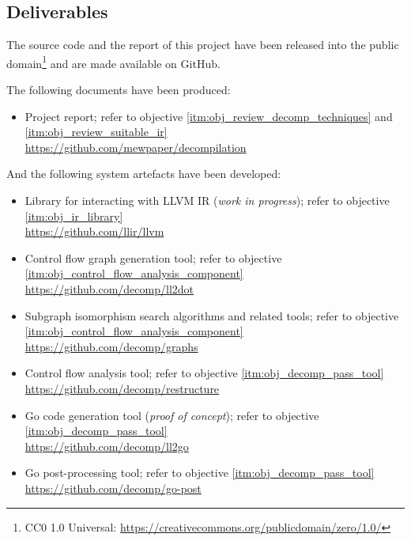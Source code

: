 
\subsection{Deliverables}

The source code and the report of this project have been released into the public domain\footnote{CC0 1.0 Universal: \url{https://creativecommons.org/publicdomain/zero/1.0/}} and are made available on GitHub.

The following documents have been produced:
\begin{itemize}
	\item Project report; refer to objective \ref{itm:obj_review_decomp_techniques} and \ref{itm:obj_review_suitable_ir} \\ \url{https://github.com/mewpaper/decompilation}
\end{itemize}

And the following system artefacts have been developed:
\begin{itemize}
	\item Library for interacting with LLVM IR (\textit{work in progress}); refer to objective \ref{itm:obj_ir_library} \\ \url{https://github.com/llir/llvm}
	\item Control flow graph generation tool; refer to objective \ref{itm:obj_control_flow_analysis_component} \\ \url{https://github.com/decomp/ll2dot}
	\item Subgraph isomorphism search algorithms and related tools; refer to objective \ref{itm:obj_control_flow_analysis_component} \\ \url{https://github.com/decomp/graphs}
	\item Control flow analysis tool; refer to objective \ref{itm:obj_decomp_pass_tool} \\ \url{https://github.com/decomp/restructure}
	\item Go code generation tool (\textit{proof of concept}); refer to objective \ref{itm:obj_decomp_pass_tool} \\ \url{https://github.com/decomp/ll2go}
	\item Go post-processing tool; refer to objective \ref{itm:obj_decomp_pass_tool} \\ \url{https://github.com/decomp/go-post}
\end{itemize}
